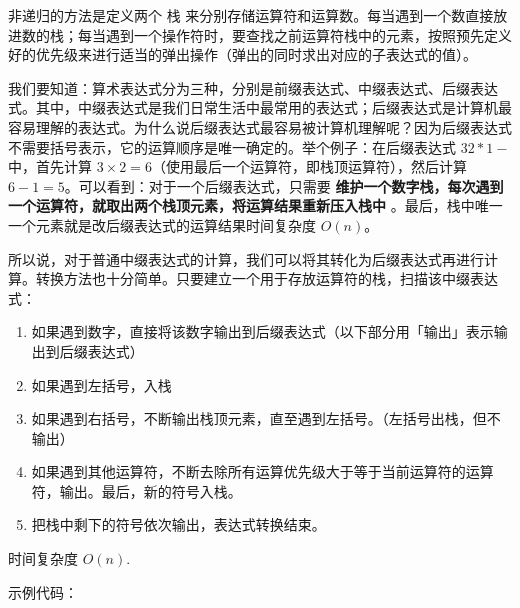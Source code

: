 非递归的方法是定义两个  栈  来分别存储运算符和运算数。每当遇到一个数直接放进数的栈；每当遇到一个操作符时，要查找之前运算符栈中的元素，按照预先定义好的优先级来进行适当的弹出操作（弹出的同时求出对应的子表达式的值）。

我们要知道：算术表达式分为三种，分别是前缀表达式、中缀表达式、后缀表达式。其中，中缀表达式是我们日常生活中最常用的表达式；后缀表达式是计算机最容易理解的表达式。为什么说后缀表达式最容易被计算机理解呢？因为后缀表达式不需要括号表示，它的运算顺序是唯一确定的。举个例子：在后缀表达式 $3 2 * 1 -$ 中，首先计算 $3 \times 2 = 6$（使用最后一个运算符，即栈顶运算符），然后计算 $6 - 1 = 5$。可以看到：对于一个后缀表达式，只需要 \textbf{ 维护一个数字栈，每次遇到一个运算符，就取出两个栈顶元素，将运算结果重新压入栈中 }。最后，栈中唯一一个元素就是改后缀表达式的运算结果时间复杂度 $O(n)$。

所以说，对于普通中缀表达式的计算，我们可以将其转化为后缀表达式再进行计算。转换方法也十分简单。只要建立一个用于存放运算符的栈，扫描该中缀表达式：

\begin{enumerate}
\item 如果遇到数字，直接将该数字输出到后缀表达式（以下部分用「输出」表示输出到后缀表达式）
\item 如果遇到左括号，入栈
\item 如果遇到右括号，不断输出栈顶元素，直至遇到左括号。（左括号出栈，但不输出）
\item 如果遇到其他运算符，不断去除所有运算优先级大于等于当前运算符的运算符，输出。最后，新的符号入栈。
\item 把栈中剩下的符号依次输出，表达式转换结束。
\end{enumerate}

时间复杂度 $O(n)$.

示例代码：

